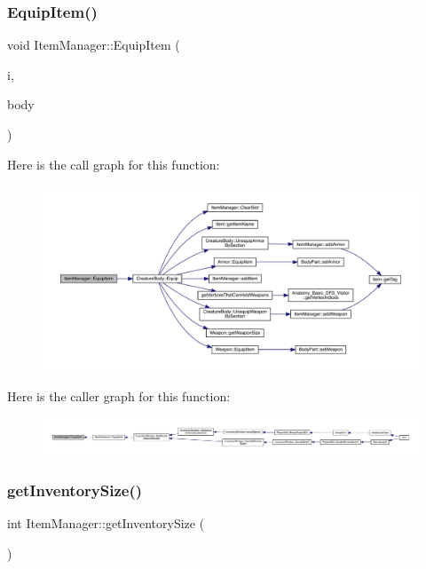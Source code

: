 \subsubsection{\texorpdfstring{Equip\+Item()}{EquipItem()}}
{\footnotesize\ttfamily void Item\+Manager\+::\+Equip\+Item (\begin{DoxyParamCaption}\item[{int}]{i,  }\item[{\mbox{\hyperlink{class_creature_body}{Creature\+Body}} \&}]{body }\end{DoxyParamCaption})}

Here is the call graph for this function\+:
\nopagebreak
\begin{figure}[H]
\begin{center}
\leavevmode
\includegraphics[width=350pt]{dc/de1/class_item_manager_a55d0009a402e2f5fc3a18cf0629cec64_cgraph}
\end{center}
\end{figure}
Here is the caller graph for this function\+:
\nopagebreak
\begin{figure}[H]
\begin{center}
\leavevmode
\includegraphics[width=350pt]{dc/de1/class_item_manager_a55d0009a402e2f5fc3a18cf0629cec64_icgraph}
\end{center}
\end{figure}
\mbox{\label{class_item_manager_aba8fa0833328eacca5f55e16c5eb0fe9}} 
\subsubsection{\texorpdfstring{get\+Inventory\+Size()}{getInventorySize()}}
{\footnotesize\ttfamily int Item\+Manager\+::get\+Inventory\+Size (\begin{DoxyParamCaption}{ }\end{DoxyParamCaption})}

